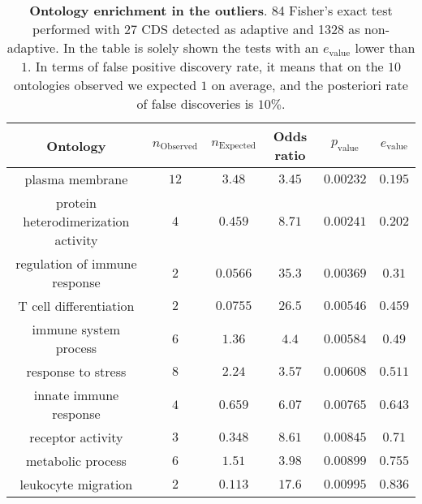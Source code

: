 \documentclass[10pt]{article}
\begin{document}
\begin{table}[ht!]
\centering
\begin{adjustbox}{width = 1\textwidth}
	\small\begin{tabular}{|c|c|c|c|c|c|}
		\hline
		Ontology & $n_{\mathrm{Observed}}$ & $n_{\mathrm{Expected}}$ & Odds ratio & $p_{\mathrm{value}}$ & $e_{\mathrm{value}}$\\
		\hline
		plasma membrane & $12$ & $3.48$ & $3.45$ & $0.00232$ & $0.195$\\
		protein heterodimerization activity & $4$ & $0.459$ & $8.71$ & $0.00241$ & $0.202$\\
		regulation of immune response & $2$ & $0.0566$ & $35.3$ & $0.00369$ & $0.31$\\
		T cell differentiation & $2$ & $0.0755$ & $26.5$ & $0.00546$ & $0.459$\\
		immune system process & $6$ & $1.36$ & $4.4$ & $0.00584$ & $0.49$\\
		response to stress & $8$ & $2.24$ & $3.57$ & $0.00608$ & $0.511$\\
		innate immune response & $4$ & $0.659$ & $6.07$ & $0.00765$ & $0.643$\\
		receptor activity & $3$ & $0.348$ & $8.61$ & $0.00845$ & $0.71$\\
		metabolic process & $6$ & $1.51$ & $3.98$ & $0.00899$ & $0.755$\\
		leukocyte migration & $2$ & $0.113$ & $17.6$ & $0.00995$ & $0.836$\\
		\hline
	\end{tabular}
\end{adjustbox}
\caption{\textbf{Ontology enrichment in the outliers}. 84 Fisher's exact test performed with 27 CDS detected as adaptive and 1328 as non-adaptive. In the table is solely shown the tests with an  $e_{\mathrm{value}}$ lower than $1$. In terms of false positive discovery rate, it means that on the $10$ ontologies observed we expected $1$ on average, and the posteriori rate of false discoveries is $10\%$.  \label{fig:ontology}}
\end{table}
\end{document}
